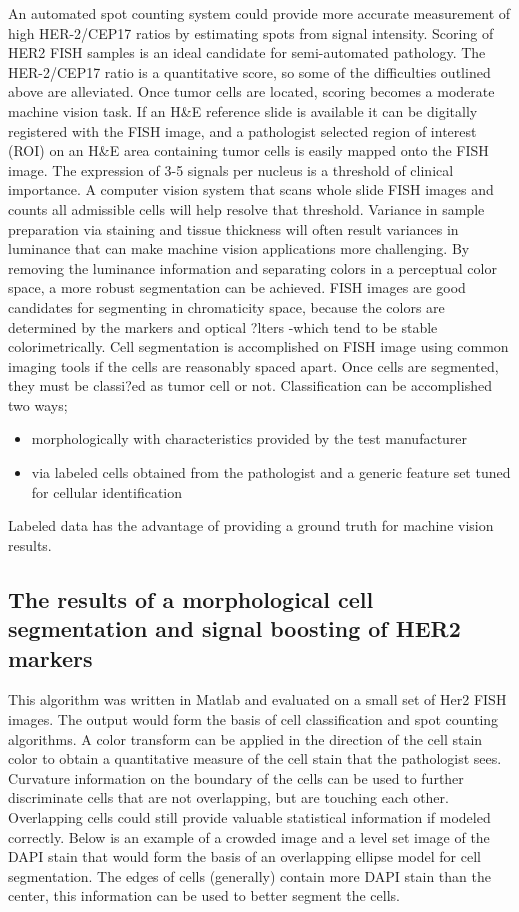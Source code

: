 An automated spot counting system could provide more accurate measurement of high HER-2/CEP17 ratios by estimating spots from signal intensity.  Scoring of HER2 FISH samples is an ideal candidate for semi-automated pathology. The HER-2/CEP17 ratio is a quantitative score, so some of the difficulties outlined above are alleviated. Once tumor cells are located, scoring becomes a moderate machine vision task. If an H\&E reference slide is available it can be digitally registered with the FISH image, and a pathologist selected region of interest (ROI) on an H\&E area containing tumor cells is easily mapped onto the FISH image. The expression of 3-5 signals per nucleus is a threshold of clinical importance. A computer vision system that scans whole slide FISH images and counts all admissible cells will help resolve that threshold.
Variance in sample preparation via staining and tissue thickness will often result variances in luminance that can make machine vision applications more challenging. By removing the luminance information and separating colors in a perceptual color space, a more robust segmentation can be achieved. FISH images are good candidates for segmenting in chromaticity space, because the colors are determined by the markers and optical ?lters -which tend to be stable colorimetrically.
Cell segmentation is accomplished on FISH image using common imaging tools if the cells are reasonably spaced apart. Once cells are segmented, they must be classi?ed as tumor cell or not. Classification can be accomplished two ways;
\begin{itemize}
\item	morphologically with characteristics provided by the test manufacturer
\item	via labeled cells obtained from the pathologist and a generic feature set tuned for cellular identification
\end{itemize}
Labeled data has the advantage of providing a ground truth for machine vision results.

\subsection{The results of a morphological cell segmentation and signal boosting of HER2 markers}

This algorithm was written in Matlab and evaluated on a small set of Her2 FISH images. The output would form the basis of cell classification and spot counting algorithms. A color transform can be applied in the direction of the cell stain color to obtain a quantitative measure of the cell stain that the pathologist sees. Curvature information on the boundary of the cells can be used to further discriminate cells that are not overlapping, but are touching each other. Overlapping cells could still provide valuable statistical information if modeled correctly.
Below is an example of a crowded image and a level set image of the DAPI stain that would form the basis of an overlapping ellipse model for cell segmentation. The edges of cells (generally) contain more DAPI stain than the center, this information can be used to better segment the cells.


